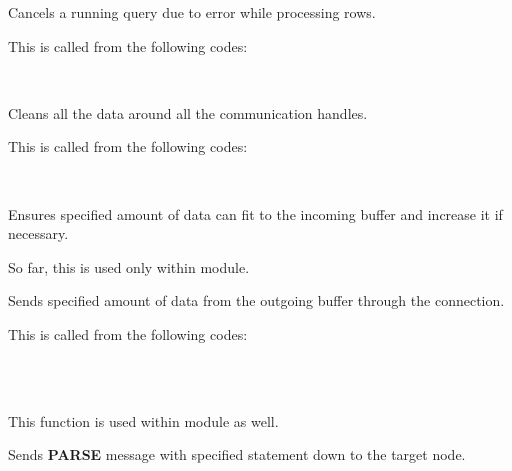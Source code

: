   
      Cancels a running query due to error while processing rows.
      
      This is called from the following codes:
      
      \FuncRefHdr
		  \\ \hline
      \FuncRefTrailor
  
  
      Cleans all the data around all the communication handles.
      
      This is called from the following codes:
       
      \FuncRefHdr
		  \\ \hline
      \FuncRefTrailor
  
  
	  Ensures specified amount of data can fit to the incoming buffer and
	  increase it if necessary.
  
	  So far, this is used only within  module.
  
  
      Sends specified amount of data from the outgoing buffer through the connection.
      
      This is called from the following codes:
  
      \FuncRefHdr
		  \\ \vspace{3pt}
		  \\ \hline
      \FuncRefTrailor
      
      This function is used within  module as well.
  
  
      Sends \textbf{PARSE} message with specified statement down to the target node.
      
